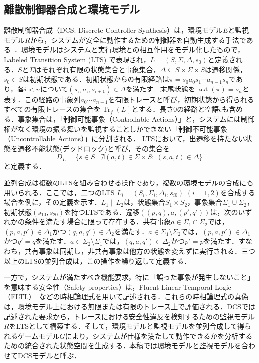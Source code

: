 \subsection{離散制御器合成と環境モデル}
離散制御器合成（DCS: Discrete Controller Synthesis）は，環境モデル$E$と監視モデル$R$から，システムが安全に動作するための制御器を自動生成する手法である~\cite{10.1145/1985793.1985823,21072}．環境モデルはシステムと実行環境との相互作用をモデル化したもので，Labeled Transition System (LTS) で表現され，$L=(S,\Sigma,\Delta,s_0)$と定義される．$S$と$\Sigma$はそれぞれ有限の状態集合と事象集合，$\Delta\subseteq S\times\Sigma\times S$は遷移関係，$s_0\in S$は初期状態である．初期状態からの有限経路は$\pi=s_0a_0s_1\cdots a_{n-1}s_n$であり，各$i<n$について$(s_i,a_i,s_{i+1})\in\Delta$を満たす．末尾状態を$\operatorname{last}(\pi)=s_n$と表す．この経路の事象列$a_0\cdots a_{n-1}$を有限トレースと呼び，初期状態から得られるすべての有限トレースの集合を$\operatorname{Tr}_f(L)$とする．長さ$0$の経路と空語$\epsilon$も含める．事象集合は，「制御可能事象（Controllable Actions）」と，システムには制御権がなく環境の振る舞いを監視することしかできない「制御不可能事象（Uncontrollable Actions）」に分割される．
LTSにおいて，出遷移を持たない状態を遷移不能状態(デッドロック)と呼び，その集合を
\[
D_L=\{s\in S\mid\nexists(a,t)\in\Sigma\times S:\ (s,a,t)\in\Delta\}
\]
と定義する．

並列合成は複数のLTSを組み合わせる操作であり，複数の環境モデルの合成にも用いられる．ここでは，二つのLTS $L_i=(S_i,\Sigma_i,\Delta_i,s_{i0})$ $(i=1,2)$を合成する場合を例に，その定義を示す．$L_1\parallel L_2$は，状態集合$S_1\times S_2$，事象集合$\Sigma_1\cup\Sigma_2$，初期状態$(s_{10},s_{20})$を持つLTSである．遷移$((p,q),a,(p',q'))$は，次のいずれかの条件を満たす場合に限って存在する．共有事象$a\in\Sigma_1\cap\Sigma_2$では，$(p,a,p')\in\Delta_1$かつ$(q,a,q')\in\Delta_2$を満たす．$a\in\Sigma_1\setminus\Sigma_2$では，$(p,a,p')\in\Delta_1$かつ$q'=q$を満たす．$a\in\Sigma_2\setminus\Sigma_1$では，$(q,a,q')\in\Delta_2$かつ$p'=p$を満たす．すなわち，共有事象は同期し，非共有事象は他方の状態を変えずに実行される．三つ以上のLTSの並列合成は，この操作を繰り返して定義する．

一方で，システムが満たすべき機能要求，特に「誤った事象が発生しないこと」を意味する安全性（Safety properties）は，Fluent Linear Temporal Logic（FLTL）~\cite{FLTL}などの時相論理式を用いて記述される．これらの時相論理式の真偽は，環境モデル上における無限または有限のトレース上で評価される．DCSでは記述された要求から，トレースにおける安全性違反を検知するための監視モデル$R$をLTSとして構築する．そして，環境モデルと監視モデルを並列合成して得られるゲームモデル$G$により，システムが仕様を満たして動作できるかを分析するための統合された状態空間を生成する．本稿では環境モデルと監視モデルを合わせてDCSモデルと呼ぶ．

